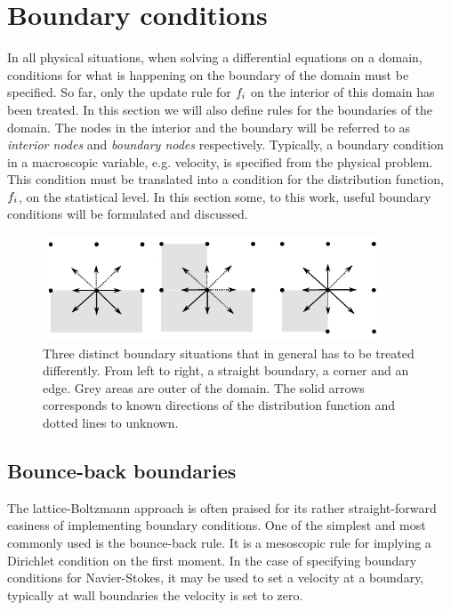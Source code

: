 \section{Boundary conditions}\label{sec:lbm:bound}
In all physical situations, when solving a differential equations on a
domain, conditions for what is happening on the boundary of the domain
must be specified. So far, only the update rule for $f_i$ on the
interior of this domain has been treated. In this section we will
also define rules for the boundaries of the domain. The nodes in the
interior and the boundary will be referred to as \emph{interior nodes}
and \emph{boundary nodes} respectively. Typically, a boundary
condition in a macroscopic variable, e.g. velocity, is specified from
the physical problem. This condition must be translated into a
condition for the distribution function, $f_i$, on the statistical
level. In this section some, to this work, useful boundary conditions
will be formulated and discussed.

\begin{figure}
\begin{center}
\includegraphics[width=0.9\textwidth]{fig/bb.pdf}
\end{center}
\caption{Three distinct boundary situations that in general has to be
  treated differently. From left to right, a straight boundary, a
  corner and an edge. Grey areas are outer of the domain. The solid
  arrows corresponds to known directions of the distribution function
  and dotted lines to unknown.}
\label{fig:lbm:bounds}
\end{figure}

\subsection{Bounce-back boundaries}\label{sec:lbm:bb}
The lattice-Boltzmann approach is often praised for its rather
straight-forward easiness of implementing boundary conditions. One of
the simplest and most commonly used is the bounce-back rule. It is a
mesoscopic rule for implying a Dirichlet condition on the first
moment. In the case of specifying boundary conditions for
Navier-Stokes, it may be used to set a velocity at a boundary,
typically at wall boundaries the velocity is set to zero.

